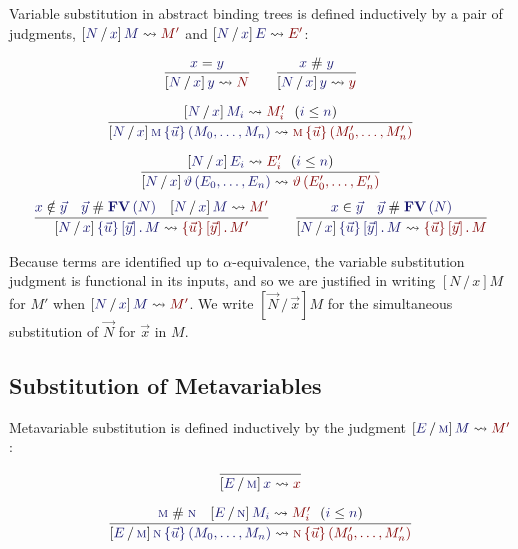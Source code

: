 \documentclass[11pt]{article}
\theoremstyle{definition}
\theoremstyle{remark}
\numberwithin{equation}{section}
\def\IModeColorName{MidnightBlue}
\def\OModeColorName{Maroon}
\newcommand\IMode[1]{{\color{\IModeColorName}{#1}}}
\newcommand\OMode[1]{{\color{\OModeColorName}{#1}}}
\newcommand\HypJ[2]{#1\ \ (#2)}
\newcommand\Member[2]{\IMode{#1}\in\IMode{#2}}
\newcommand\MkBTm[3]{\left\{#1\right\}\left[#2\right].\, #3}
\newcommand\Leq[2]{\IMode{#1}\leq\IMode{#2}}
\newcommand\MV[1]{\textsc{#1}}
\newcommand\MApp[3]{#1\left\{#2\right\}\left(#3\right)}
\newcommand\App[2]{#1\left(#2\right)}
\newcommand\FV[1]{\mathbf{FV}\left(#1\right)}
\newcommand\NotIn[2]{\IMode{#1}\notin\IMode{#2}}
\newcommand\Subst[3]{
  \left[#1\, /\, #2\right]#3%
}
\newcommand\IsSubst[4]{%
  \Subst{\IMode{#1}}{\IMode{#2}}{\IMode{#3}}%
  \leadsto\OMode{#4}%
}
\newcommand\IsEq[2]{\IMode{#1} = \IMode{#2}}
\newcommand\IsApart[2]{\IMode{#1} \mathrel{\#} \IMode{#2}}
\begin{document}
Variable substitution in abstract binding trees is defined inductively by a
pair of judgments, $\IsSubst{N}{x}{M}{M'}$ and $\IsSubst{N}{x}{E}{E'}$:

\begin{gather*}
  \infer{
    \IsSubst{N}{x}{y}{N}
  }{
    \IsEq{x}{y}
  }\qquad
  \infer{
    \IsSubst{N}{x}{y}{y}
  }{
    \IsApart{x}{y}
  }\\[6pt]
  \infer{
    \IsSubst{N}{x}{
      \MApp{\MV{m}}{\vec{u}}{M_0,\dots,M_n}
    }{
      \MApp{\MV{m}}{\vec{u}}{M'_0,\dots,M'_n}
    }
  }{
    \HypJ{
      \IsSubst{N}{x}{M_i}{M'_i}
    }{
      \Leq{i}{n}
    }
  }\\[6pt]
  \infer{
    \IsSubst{N}{x}{
      \App{\vartheta}{E_0,\dots,E_n}
    }{
      \App{\vartheta}{E'_0,\dots,E'_n}
    }
  }{
    \HypJ{
      \IsSubst{N}{x}{E_i}{E'_i}
    }{
      \Leq{i}{n}
    }
  }
\end{gather*}
\begin{gather*}
  \infer{
    \IsSubst{N}{x}{
      \MkBTm{\vec{u}}{\vec{y}}{M}
    }{
      \MkBTm{\vec{u}}{\vec{y}}{M'}
    }
  }{
    \NotIn{x}{\vec{y}} &
    \IsApart{\vec{y}}{\FV{N}} &
    \IsSubst{N}{x}{M}{M'}
  }\qquad
  \infer{
    \IsSubst{N}{x}{
      \MkBTm{\vec{u}}{\vec{y}}{M}
    }{
      \MkBTm{\vec{u}}{\vec{y}}{M}
    }
  }{
    \Member{x}{\vec{y}} &
    \IsApart{\vec{y}}{\FV{N}}
  }
\end{gather*}

Because terms are identified up to $\alpha$-equivalence, the variable
substitution judgment is functional in its inputs, and so we are justified in
writing $\Subst{N}{x}{M}$ for $M'$ when $\IsSubst{N}{x}{M}{M'}$. We write
$\Subst{\vec{N}}{\vec{x}}{M}$ for the simultaneous substitution of $\vec{N}$
for $\vec{x}$ in $M$.

\subsection{Substitution of Metavariables}

Metavariable substitution is defined inductively by the judgment
$\IsSubst{E}{\MV{m}}{M}{M'}$:

\begin{gather*}
  \infer{
    \IsSubst{E}{\MV{m}}{x}{x}
  }{
  }\\[6pt]
  \infer{
    \IsSubst{E}{\MV{m}}{
      \MApp{\MV{n}}{\vec{u}}{M_0,\dots,M_n}
    }{
      \MApp{\MV{n}}{\vec{u}}{M'_0,\dots,M'_n}
    }
  }{
    \IsApart{\MV{m}}{\MV{n}} &
    \HypJ{
      \IsSubst{E}{\MV{n}}{M_i}{M'_i}
    }{
      \Leq{i}{n}
    }
  }\\[6pt]
\end{gather*}
\end{document}
